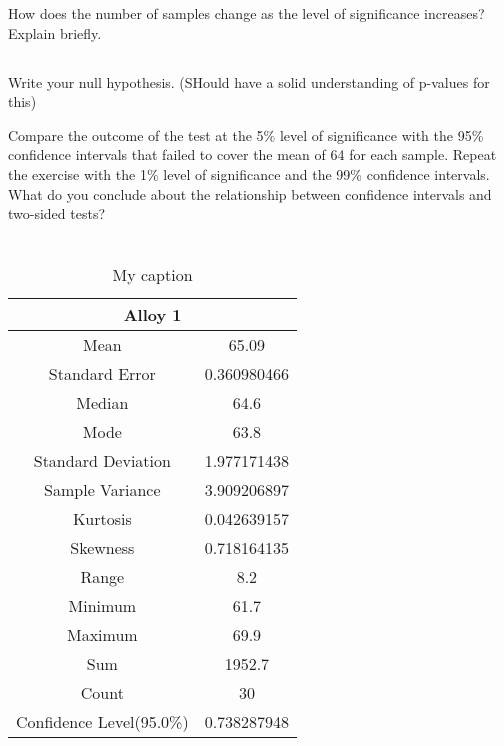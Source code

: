 \documentclass[letterpaper]{article}
\begin{document}
How does the number of samples change as
the level of significance increases? Explain briefly.

\subsection{}%

Write your null hypothesis. (SHould have a solid understanding of p-values for this)

Compare the outcome of the test at the 5\% level of significance with the 95\% confidence intervals
that failed to cover the mean of 64 for each sample. Repeat the exercise with the 1\% level of
significance and the 99\% confidence intervals. What do you conclude about the relationship
between confidence intervals and two-sided tests?

\section{}%

\begin{table}[H]
 \centering
 \begin{tabular}{|c|c|}
  \hline
  \multicolumn{2}{|c|}{Alloy 1}          \\ \hline
  Mean                     & 65.09       \\ \hline
  Standard Error           & 0.360980466 \\ \hline
  Median                   & 64.6        \\ \hline
  Mode                     & 63.8        \\ \hline
  Standard Deviation       & 1.977171438 \\ \hline
  Sample Variance          & 3.909206897 \\ \hline
  Kurtosis                 & 0.042639157 \\ \hline
  Skewness                 & 0.718164135 \\ \hline
  Range                    & 8.2         \\ \hline
  Minimum                  & 61.7        \\ \hline
  Maximum                  & 69.9        \\ \hline
  Sum                      & 1952.7      \\ \hline
  Count                    & 30          \\ \hline
  Confidence Level(95.0\%) & 0.738287948 \\ \hline
 \end{tabular}
 \caption{My caption}
 \label{3a1}
\end{table}
\end{document}
